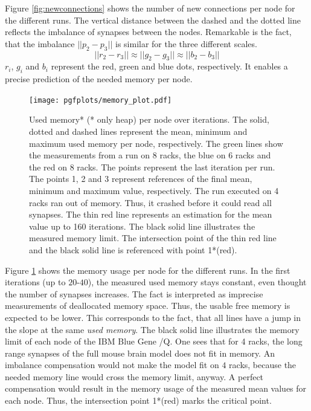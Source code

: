 Figure \ref{fig:newconnections} shows the number of new connections per node for the different runs.
The vertical distance between the dashed and the dotted line reflects the imbalance of synapses between the nodes.
Remarkable is the fact, that the imbalance $||p_2-p_3||$ is similar for the three different scales.
\begin{equation}
	||r_2-r_3|| \approx ||g_2-g_3|| \approx ||b_2-b_3||
\end{equation}
$r_i$, $g_i$ and $b_i$ represent the red, green and blue dots, respectively.
It enables a precise prediction of the needed memory per node.
\begin{figure}[h!]
\begin{center}
 \texttt{[image: pgfplots/memory\_plot.pdf]}
\end{center}
\caption[Used memory* (* only heap) per node over iterations]{Used memory* (* only heap) per node over iterations.
The solid, dotted and dashed lines represent the mean, minimum and maximum used memory per node, respectively.
The green lines show the measurements from a run on 8 racks, the blue on 6 racks and the red on 8 racks.
The points represent the last iteration per run.
The points 1, 2 and 3 represent references of the final mean, minimum and maximum value, respectively.
The run executed on 4 racks ran out of memory. Thus, it crashed before it could read all synapses.
The thin red line represents an estimation for the mean value up to 160 iterations.
The black solid line illustrates the measured memory limit.
The intersection point of the thin red line and the black solid line is referenced with point 1*(red).
 }
\label{fig:memoryplot}
\end{figure}
Figure \ref{fig:memoryplot} shows the memory usage per node for the different runs.
In the first iterations (up to $20$-$40$), the measured used memory stays constant, even thought the number of synapses increases.
The fact is interpreted as imprecise measurements of deallocated memory space.
Thus, the usable free memory is expected to be lower.
This corresponds to the fact, that all lines have a jump in the slope at the same \emph{used memory}.
The black solid line illustrates the memory limit of each node of the IBM Blue Gene /Q.
One sees that for 4 racks, the long range synapses of the full mouse brain model does not fit in memory.
An imbalance compensation would not make the model fit on $4$ racks,
because the needed memory line would cross the memory limit, anyway.
A perfect compensation would result in the memory usage of the measured mean values for each node.
Thus, the intersection point 1*(red) marks the critical point.

